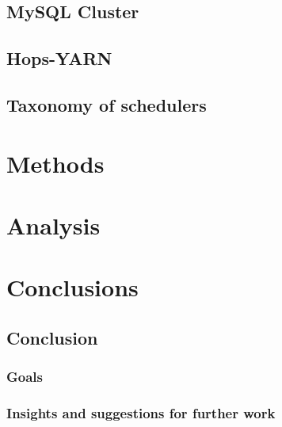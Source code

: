 \documentclass[12pt,a4paper,twoside,openright]{book}
\begin{document}
\section{MySQL Cluster}
\label{sec:ndb}


\section{Hops-YARN}
\label{sec:hopsyarn}


\section{Taxonomy of schedulers}
\label{sec:taxonomy_of_schedulers}


\chapter{Methods}
\label{chap:methods}


\chapter{Analysis}
\label{chap:analysis}


\chapter{Conclusions}
\label{chap:conclusion}

\section{Conclusion}
\label{sec:conclusion}


\subsection{Goals}
\label{ssec:goals}


\subsection{Insights and suggestions for further work}
\label{ssec:insights-and-suggestions}

\end{document}
